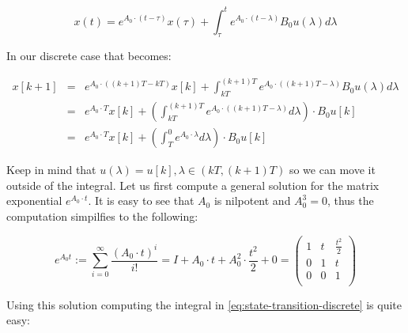 \documentclass[english,ngerman]{KITreprt}
\begin{document}
\begin{equation}
x(t) = e^{A_0 \cdot (t - \tau)} x(\tau) + \int^t_\tau e^{A_0 \cdot (t - \lambda)} B_0 u(\lambda) d\lambda
\end{equation}

In our discrete case that becomes:

\begin{eqnarray} \label{eq:state-transition-discrete}
x[k+1] & = & e^{A_0 \cdot ((k+1)T - kT)} x[k] + \int^{(k+1)T}_{kT} e^{A_0 \cdot ((k+1)T - \lambda)} B_0 u(\lambda) d\lambda \\
       & = & e^{A_0 \cdot T} x[k] + \left(\int^{(k+1)T}_{kT} e^{A_0 \cdot ((k+1)T - \lambda)} d\lambda \right) \cdot B_0 u[k]\\
       & = & e^{A_0 \cdot T} x[k] + \left(\int^{0}_{T} e^{A_0 \cdot \lambda} d\lambda\right) \cdot B_0 u[k]
\end{eqnarray}

Keep in mind that $u(\lambda) = u[k], \lambda \in (kT, (k+1)T)$ so we
can move it outside of the integral. Let us first compute a general
solution for the matrix exponential $e^{A_0 \cdot t}$. It is easy to see
that $A_0$ is nilpotent and $A_0^3 = 0$, thus the computation simpilfies
to the following:

\begin{equation}
e^{A_0 t} := \sum^{\infty}_{i=0} \frac{(A_0 \cdot t)^i}{i!} = I + A_0 \cdot t + A_0^2 \cdot \frac{t^2}{2} + 0
=
\left(\begin{array}{ccc}
1 & t & \frac{t^2}{2}\\
0 & 1 & t \\
0 & 0 & 1 \\
\end{array}\right)
\end{equation}

Using this solution computing the integral in
\ref{eq:state-transition-discrete} is quite easy:
\end{document}

